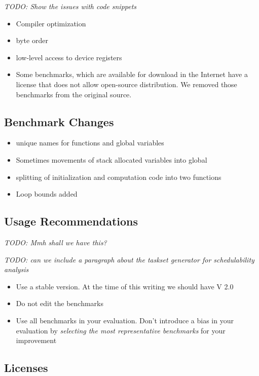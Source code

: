 \documentclass[a4paper,UKenglish]{oasics}
\newcommand{\todo}[1]{{\emph{TODO: #1}}}
\begin{document}
\todo{Show the issues with code snippets}

\begin{itemize}
\item Compiler optimization
\item byte order
\item low-level access to device registers
\item Some benchmarks, which are available for download in the Internet have a license that
does not allow open-source distribution. We removed those benchmarks from the original source.
\end{itemize}

\subsection{Benchmark Changes}



\begin{itemize}
\item unique names for functions and global variables
\item Sometimes movements of stack allocated variables into global
\item splitting of initialization and computation code into two functions
\item Loop bounds added
\end{itemize}


\subsection{Usage Recommendations}

\todo{Mmh shall we have this?}

\todo{can we include a paragraph about the taskset generator for schedulability analysis}

\begin{itemize}
\item Use a stable version. At the time of this writing we should have V 2.0
\item Do not edit the benchmarks
\item Use all benchmarks in your evaluation. Don't introduce a bias in your evaluation by
\emph{selecting the most representative benchmarks} for your improvement
\end{itemize}

\subsection{Licenses}
\end{document}
